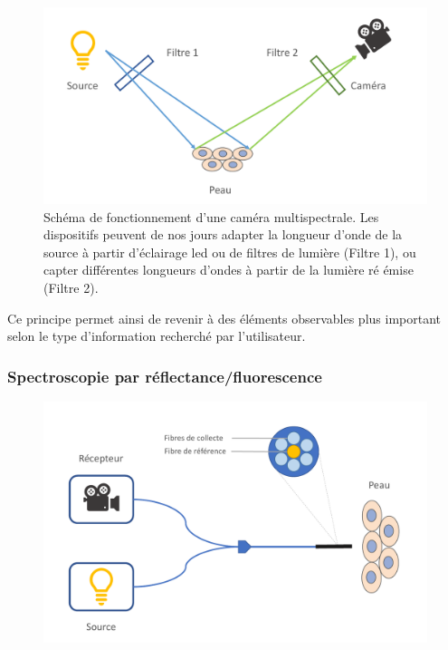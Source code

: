 \addtocounter{footnote}{1}

\begin{figure}[H]
    \centering
    \includegraphics[width=0.8\linewidth]{contents/chapter_2/resources/multispectral_principle.pdf}
    \caption{Schéma de fonctionnement d'une caméra multispectrale. Les dispositifs peuvent de nos jours adapter la longueur d'onde de la source à partir d'éclairage \gls{led} ou de filtres de lumière (Filtre 1), ou capter différentes longueurs d'ondes à partir de la lumière ré émise (Filtre 2).}
    \label{fig:multispectral_principle}
\end{figure}\par

Ce principe permet ainsi de revenir à des éléments observables plus important selon le type d'information recherché par l'utilisateur.\par 

\subsubsection{Spectroscopie par réflectance/fluorescence}
\begin{figure}[H]
    \centering
    \includegraphics[width=0.8\linewidth]{contents/chapter_2/resources/spectroscopy_principle.pdf}
    \caption{}
    \label{fig:spectroscopy_principle}
\end{figure}\par

